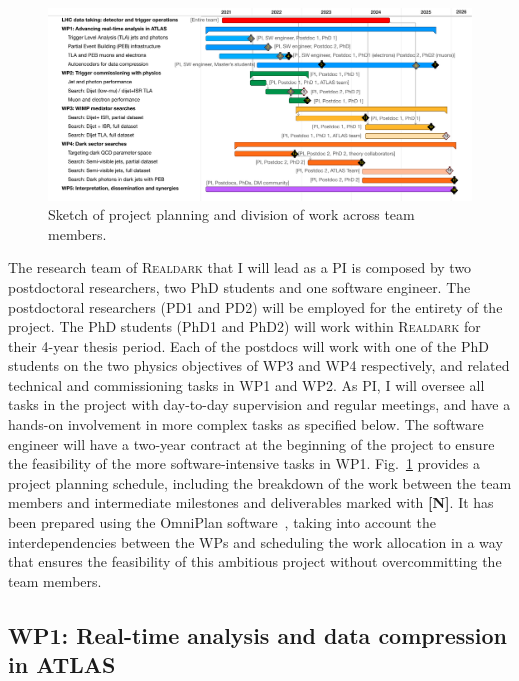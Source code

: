 \begin{figure}[!htpb] 
\begin{center}
\includegraphics[width=\textwidth]{figs_B2/gantt}
\caption{\color{black}\label{fig:gantt} \small Sketch of project planning and division of work across team members.} 
\vskip2pt
\end{center}
\end{figure}

The research team of \textsc{Realdark} that I will lead as a PI is composed by two postdoctoral researchers, two PhD students and one software engineer.
The postdoctoral researchers (PD1 and PD2) will be employed for the entirety of the project. 
The PhD students (PhD1 and PhD2) will work within \textsc{Realdark} for their 4-year thesis period. 
Each of the postdocs will work with one of the PhD students on the two physics objectives of WP3 and WP4 respectively, and related technical and commissioning tasks in WP1 and WP2. 
As PI, I will oversee all tasks in the project with day-to-day supervision and regular meetings, and have a hands-on involvement in more complex tasks as specified below. 
The software engineer will have a two-year contract at the beginning of the project to ensure the feasibility of the more software-intensive tasks in WP1. 
Fig.~\ref{fig:gantt} provides a project planning schedule, including the breakdown of the work between the team members and intermediate milestones and deliverables marked with \textbf{[N]}. 
It has been prepared using the OmniPlan software~\cite{omni:plan},%
taking into account the interdependencies between the WPs and 
scheduling the work allocation in a way that ensures the feasibility of this ambitious project without overcommitting the team members. 

\subsection{WP1: Real-time analysis and data compression in ATLAS}

